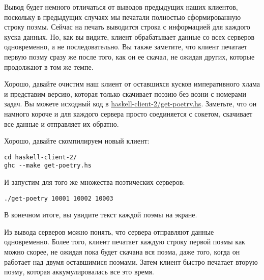 Вывод будет немного отличаться от выводов предыдущих наших клиентов, 
поскольку в предыдущих случаях мы печатали полностью сформированную  
строку поэмы. Сейчас на печать выводится строка с информацией для 
каждого куска данных. Но, как вы видите, клиент обрабатывает 
данные со всех серверов одновременно, а не последовательно. Вы также  
заметите, что клиент печатает первую поэму сразу же после того, как 
он ее скачал, не ожидая других, которые продолжают в том же темпе. 


Хорошо, давайте очистим наш клиент от оставшихся кусков императивного 
хлама и представим версию, которая только скачивает поэзию без возни с 
номерами задач. Вы можете исходный код в 
\href{https://github.com/jdavisp3/twisted-intro/blob/master/haskell-client-2/get-poetry.hs}{haskell-client-2/get-poetry.hs}. 
Заметьте, что он намного короче и для каждого сервера просто 
соединяется с сокетом, скачивает все данные и 
отправляет их обратно.


Хорошо, давайте скомпилируем новый клиент:

 \begin{verbatim}
cd haskell-client-2/
ghc --make get-poetry.hs
\end{verbatim} 


И запустим для того же множества поэтических серверов:
 \begin{verbatim}
./get-poetry 10001 10002 10003
\end{verbatim} 


В конечном итоге, вы увидите текст каждой поэмы на экране.


Из вывода серверов можно понять, что сервера отправляют 
данные одновременно. Более того, клиент печатает каждую 
строку первой поэмы как можно скорее, не ожидая пока 
будет скачана вся поэма, даже того, когда он работает 
над двумя оставшимися поэмами. Затем клиент быстро 
печатает вторую поэму, которая аккумулировалась все это время.


